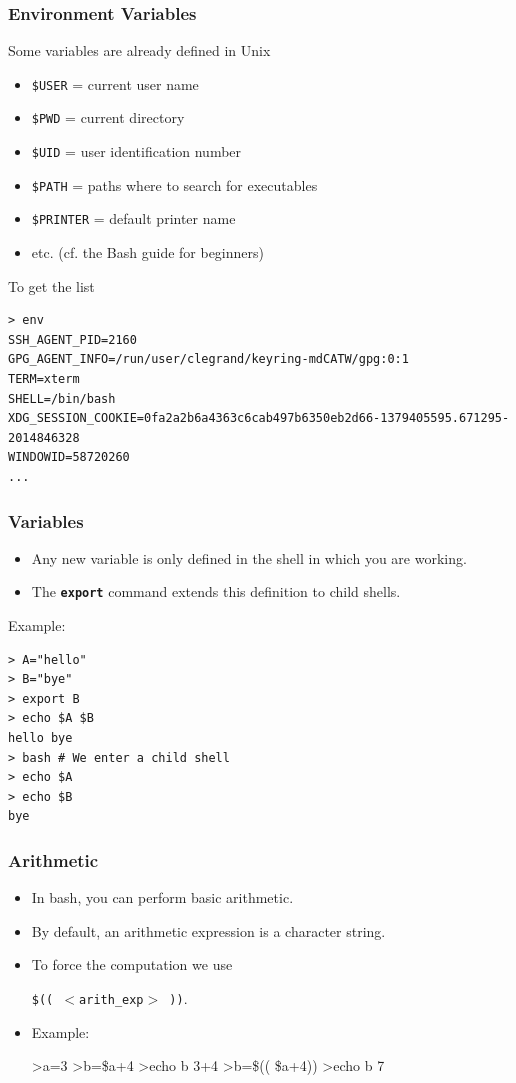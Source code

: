 \documentclass{beamer}
\newenvironment{terminal}{\color{white}\begin{snugshade*}}
{\end{snugshade*}\color{black}}
\begin{document}
\begin{frame}[fragile]
\frametitle{Environment Variables}
Some variables are already defined in Unix
\begin{itemize}
\item \verb|$USER| = current user name
\item \verb|$PWD| = current directory
\item \verb|$UID| =  user identification number
\item \verb|$PATH| =  paths where to search for executables
\item \verb|$PRINTER| =  default printer name
\item etc. (cf. the Bash guide for beginners)
\end{itemize}
To get the list
\begin{terminal}
\begin{scriptsize}
\begin{verbatim}
> env
SSH_AGENT_PID=2160
GPG_AGENT_INFO=/run/user/clegrand/keyring-mdCATW/gpg:0:1
TERM=xterm
SHELL=/bin/bash
XDG_SESSION_COOKIE=0fa2a2b6a4363c6cab497b6350eb2d66-1379405595.671295-2014846328
WINDOWID=58720260
...
\end{verbatim}
\end{scriptsize}
\end{terminal}
\end{frame}

\begin{frame}[fragile]
\frametitle{Variables}
\begin{itemize}
\item Any new variable is only defined in the shell in which you are working.
\item The \texttt{\bf export} command extends this definition to child shells.
\end{itemize}
{\color{blue} Example:}
\begin{terminal}
\begin{verbatim}
> A="hello"
> B="bye"
> export B
> echo $A $B
hello bye
> bash # We enter a child shell
> echo $A
> echo $B
bye
\end{verbatim}
\end{terminal}
\end{frame}

\begin{frame}[fragile]
\frametitle{Arithmetic}
\begin{itemize}
\item In bash, you can perform basic arithmetic.
\item By default, an arithmetic expression is a character string.
\item To force the computation we use
\begin{center}
\texttt{\$(( $<$arith\_exp$>$ ))}.
\end{center}
\item Example:
\begin{terminal}
\begin{semiverbatim}
>a=3
>b=\$a+4
>echo b
3+4
>b=\$(( \$a+4))
>echo b
7
\end{semiverbatim}
\end{terminal}
\end{itemize}
\end{frame}
\end{document}
